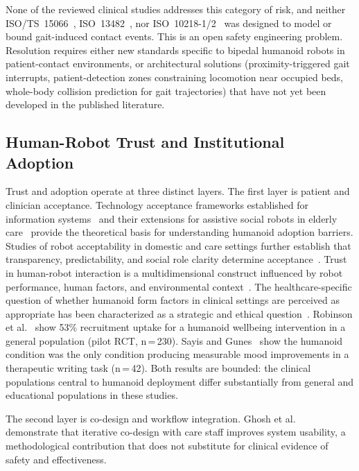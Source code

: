 \documentclass[acmsmall]{acmart}
\begin{document}
None of the reviewed clinical studies addresses this category of risk, and neither
ISO/TS~15066~\cite{isots15066}, ISO~13482~\cite{iso13482}, nor
ISO~10218-1/2~\cite{iso10218_1,iso10218_2} was designed to model or bound
gait-induced contact events. This is an open safety engineering problem.
Resolution requires either new standards specific to bipedal humanoid robots in
patient-contact environments, or architectural solutions (proximity-triggered
gait interrupts, patient-detection zones constraining locomotion near occupied
beds, whole-body collision prediction for gait trajectories) that have not yet
been developed in the published literature.

\subsection{Human-Robot Trust and Institutional Adoption}
\label{sec:trust}

Trust and adoption operate at three distinct layers. The first layer is patient
and clinician acceptance. Technology acceptance frameworks established for
information systems~\cite{venkatesh2003user} and their extensions for assistive
social robots in elderly care~\cite{heerink2010assessing,broadbent2017interactions}
provide the theoretical basis for understanding humanoid adoption barriers.
Studies of robot acceptability in domestic and care settings further establish
that transparency, predictability, and social role clarity determine
acceptance~\cite{young2009toward}.
Trust in human-robot interaction is a multidimensional construct influenced by
robot performance, human factors, and environmental
context~\cite{hancock2011meta,hancock2011trust,sciutti2018humanizing}. The healthcare-specific question of whether
humanoid form factors in clinical settings are perceived as appropriate has been
characterized as a strategic and ethical
question~\cite{ozturkcan2022humanoid}. Robinson et al.~\cite{robinson2023brief}
show 53\% recruitment uptake for a humanoid wellbeing intervention in a general
population (pilot RCT, n\,=\,230). Sayis and Gunes~\cite{sayis2024technology}
show the humanoid condition was the only condition producing measurable mood
improvements in a therapeutic writing task (n\,=\,42). Both results are bounded:
the clinical populations central to humanoid deployment differ substantially from
general and educational populations in these studies.

The second layer is co-design and workflow integration. Ghosh et
al.~\cite{ghosh2024usercentered} demonstrate that iterative co-design with care
staff improves system usability, a methodological contribution that does not
substitute for clinical evidence of safety and effectiveness.
\end{document}
